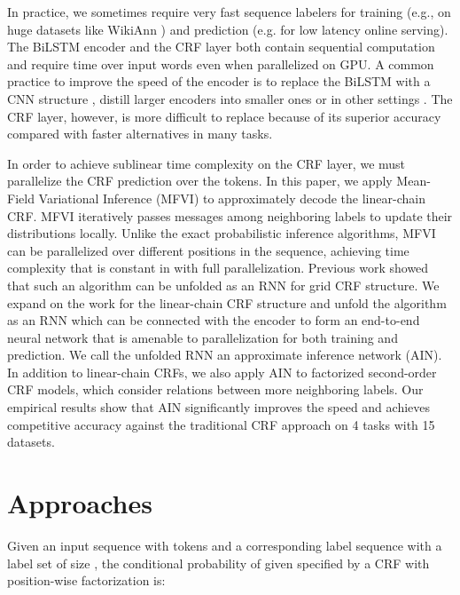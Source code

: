 \documentclass[11pt,a4paper]{article}
\begin{document}
In practice, we sometimes require very fast sequence labelers for training (e.g., on huge datasets like WikiAnn \cite{pan-etal-2017-cross}) and prediction (e.g. for low latency online serving). The BiLSTM encoder and the CRF layer both contain sequential computation and require  time over  input words even when parallelized on GPU. A common practice to improve the speed of the encoder is to replace the BiLSTM with a CNN structure \cite{collobert2011natural,strubell-etal-2017-fast}, distill larger encoders into smaller ones \cite{tsai-etal-2019-small,mukherjee2020tinymbert} or in other settings \cite{tu2018learning,yang-etal-2018-design,tu-gimpel-2019-benchmarking,cui-zhang-2019-hierarchically}. The CRF layer, however, is more difficult to replace because of its superior accuracy compared with faster alternatives in many tasks. 

In order to achieve sublinear time complexity on the CRF layer, we must parallelize the CRF prediction over the tokens. In this paper, we apply Mean-Field Variational Inference (MFVI) to approximately decode the linear-chain CRF. MFVI iteratively passes messages among neighboring labels to update their distributions locally. Unlike the exact probabilistic inference algorithms, MFVI can be parallelized over different positions in the sequence, achieving time complexity that is constant in  with full parallelization.
Previous work \cite{zheng2015conditional} showed that such an algorithm can be unfolded as an RNN for grid CRF structure. We expand on the work for the linear-chain CRF structure and unfold the algorithm as an RNN
which can be connected with the encoder to form an end-to-end neural network that is amenable to parallelization for both training and prediction. We call the unfolded RNN an approximate inference network (AIN). In addition to linear-chain CRFs, we also apply AIN to factorized second-order CRF models, which consider relations between more neighboring labels. Our empirical results show that AIN significantly improves the speed and achieves competitive accuracy against the traditional CRF approach on 4 tasks with 15 datasets.



\section{Approaches}
Given an input sequence with  tokens  and a corresponding label sequence  with a label set of size , the conditional probability of  given  specified by a CRF with position-wise factorization is:
\end{document}
